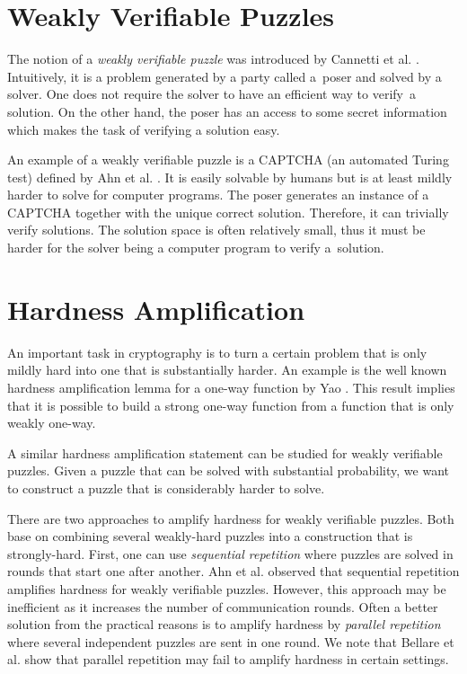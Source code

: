 \section{Weakly Verifiable Puzzles}
The notion of a \textit{weakly verifiable puzzle} was introduced by Cannetti et al. \cite{canetti2005hardness}.
Intuitively, it is a problem generated by a party called a~poser
and solved by a solver. One does not require the solver to have an efficient way to verify~a solution.
On the other hand, the poser has an access to some secret information which makes the task of verifying a solution easy.

An example of a weakly verifiable puzzle is a CAPTCHA (an automated Turing test) defined by Ahn et al. \cite{von2003captcha}.
It is easily solvable by humans but is at least mildly harder to solve for computer programs.
The poser generates an instance of a CAPTCHA together with the unique correct solution.
Therefore, it can trivially verify solutions.
The solution space is often relatively small,
thus it must be harder for the solver being a computer program to verify a~solution.

\section{Hardness Amplification}
An important task in cryptography is to turn a certain problem that is only mildly hard into one that is substantially harder.
An example is the well known hardness amplification lemma for a one-way function by Yao \cite{yao1982theory}.
This result implies that it is possible to build a strong one-way function from a function that is only weakly one-way.

A similar hardness amplification statement can be studied for weakly verifiable puzzles.
Given a puzzle that can be solved with substantial probability, we want to construct a puzzle that is considerably harder to solve.

There are two approaches to amplify hardness for weakly verifiable puzzles.
Both base on combining several weakly-hard puzzles into a construction that is strongly-hard.
First, one can use \textit{sequential repetition} where puzzles are solved in rounds that start one after another.
Ahn et al. \cite{von2003captcha} observed that sequential repetition amplifies hardness for weakly verifiable puzzles.
However, this approach may be inefficient as it increases the number of communication rounds.
Often a better solution from the practical reasons is to amplify hardness by \textit{parallel repetition}
where several independent puzzles are sent in one round.
We note that Bellare et al. \cite{bellare1997does} show that parallel repetition may fail to amplify hardness in certain settings.

